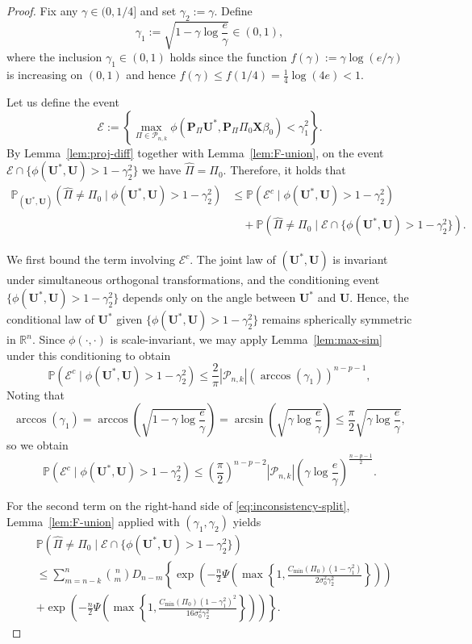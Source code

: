 \documentclass[11pt, reqno]{amsart}
\newcommand{\R}{\mathbb{R}}
\newcommand{\bP}{\mathbb{P}}
\renewcommand{\le}{\leqslant}
\newcommand{\mP}{\mathcal{P}}
\newcommand{\1}{\mbox{1}\hspace{-0.25em}\mbox{l}}
\theoremstyle{definition}\newtheorem{problem}{Problem}[section]
\theoremstyle{definition}\newtheorem{definition}[problem]{Definition}
\theoremstyle{remark}\newtheorem{assumption}{Assumption}
\theoremstyle{remark}\newtheorem{remark}[problem]{Remark}
\theoremstyle{definition}\newtheorem{example}[problem]{Example}
\theoremstyle{plain}\newtheorem{theorem}[problem]{Theorem}
\theoremstyle{plain}\newtheorem{question}[problem]{Question}
\theoremstyle{plain}\newtheorem{lemma}[problem]{Lemma}
\theoremstyle{plain}\newtheorem{proposition}[problem]{Proposition}
\theoremstyle{plain}\newtheorem{corollary}[problem]{Corollary}
\theoremstyle{plain}\newtheorem{conjecture}[problem]{Conjecture}
\begin{document}
\begin{proof}
Fix any $\gamma\in(0,1/4]$ and set $\gamma_2:=\gamma$.  Define 
\[
\gamma_1
:=
\sqrt{1-\gamma\log\frac{e}{\gamma}}
\in(0,1),
\]
where the inclusion $\gamma_1\in(0,1)$ holds since the function
$f(\gamma):=\gamma\log(e/\gamma)$ is increasing on $(0,1)$ and hence
$f(\gamma)\le f(1/4)=\frac14\log(4e)<1$.

Let us define the event
\[
\mathcal{E}
:=
\left\{
\max_{\Pi\in\mP_{n,k}}
\phi\left(
\bm P_\Pi \bm U^*,
\bm P_\Pi \Pi_0 \bm X\beta_0
\right)
<
\gamma_1^2
\right\}.
\]
By Lemma~\ref{lem:proj-diff} together with Lemma~\ref{lem:F-union}, on the event
$\mathcal{E}\cap\{\phi(\bm U^*,\bm U)>1-\gamma_2^2\}$ we have $\widehat{\Pi}=\Pi_0$.
Therefore, it holds that
\begin{align}
\bP_{(\bm U^*,\bm U)}\left(
\widehat{\Pi}\neq \Pi_0
\mid 
\phi(\bm U^*,\bm U)>1-\gamma_2^2
\right)
&\le
\bP\left(
\mathcal{E}^c
\mid 
\phi(\bm U^*,\bm U)>1-\gamma_2^2
\right)
\nonumber\\
&\quad+
\bP\left(
\widehat{\Pi}\neq \Pi_0
\mid
\mathcal{E}\cap\{\phi(\bm U^*,\bm U)>1-\gamma_2^2\}
\right).
\label{eq:inconsistency-split}
\end{align}

We first bound the term involving $\mathcal{E}^c$.
The joint law of $(\bm U^*,\bm U)$ is invariant under simultaneous orthogonal
transformations, and the conditioning event
$\{\phi(\bm U^*,\bm U)>1-\gamma_2^2\}$ depends only on the angle between
$\bm U^*$ and $\bm U$. Hence, the conditional law of $\bm U^*$ given
$\{\phi(\bm U^*,\bm U)>1-\gamma_2^2\}$ remains spherically symmetric in
$\R^n$. Since $\phi(\cdot,\cdot)$ is scale-invariant, we may apply
Lemma~\ref{lem:max-sim} under this conditioning to obtain
\[
\bP\left(
\mathcal{E}^c
 \mid 
\phi(\bm U^*,\bm U)>1-\gamma_2^2
\right)
\le
\frac{2}{\pi}|\mP_{n,k}|
\left(\arccos(\gamma_1)\right)^{n-p-1},
\]
Noting that
\[
\arccos(\gamma_1)
=
\arccos\left(\sqrt{1-\gamma\log\frac{e}{\gamma}}\right)
=
\arcsin\left(\sqrt{\gamma\log\frac{e}{\gamma}}\right)
\le
\frac{\pi}{2}\sqrt{\gamma\log\frac{e}{\gamma}},
\]
so we obtain
\[
\bP\left(
\mathcal{E}^c
 \mid 
\phi(\bm U^*,\bm U)>1-\gamma_2^2
\right)
\le
\left(\frac{\pi}{2}\right)^{n-p-2}|\mP_{n,k}|
\left(
\gamma\log\frac{e}{\gamma}
\right)^{\frac{n-p-1}{2}}.
\]

For the second term on the right-hand side of \eqref{eq:inconsistency-split},
Lemma~\ref{lem:F-union} applied with $(\gamma_1,\gamma_2)$ yields
\begin{align*}
&\bP\left(
\widehat{\Pi}\neq \Pi_0
\mid
\mathcal{E}\cap\{\phi(\bm U^*,\bm U)>1-\gamma_2^2\}
\right)\\&
\le
\sum_{m=n-k}^n\binom{n}{m}D_{n-m}
\left\{
\exp\left(
-\frac{n}{2}\Psi\left(
\max\left\{1,
\frac{C_{\min}(\Pi_0)(1-\gamma_1^2)}{2\sigma_0^2\gamma_2^2}
\right\}
\right)
\right)\right.\\&
+
\left.\exp\left(
-\frac{n}{2}\Psi\left(
\max\left\{1,
\frac{C_{\min}(\Pi_0)(1-\gamma_1^2)^2}{16\sigma_0^2\gamma_2^2}
\right\}
\right)
\right)
\right\}.    
\end{align*}


\end{proof}
\end{document}
